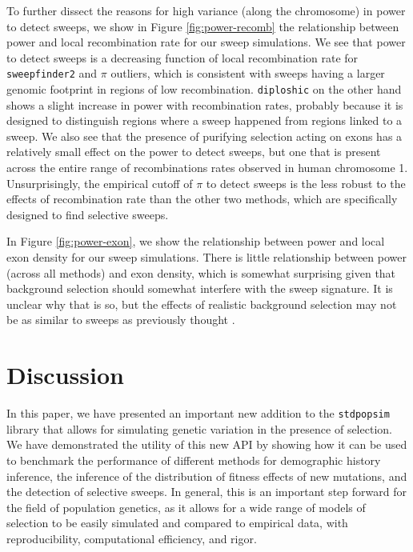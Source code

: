 \documentclass[hidelinks]{article}
\newcommand{\stdpopsim}{\texttt{stdpopsim}\xspace}
\newcommand{\sweepfinder}{\texttt{sweepfinder2}\xspace}
\newcommand{\diploshic}{\texttt{diploshic}\xspace}
\begin{document}
    To further dissect the reasons for high variance (along the chromosome) in power to detect sweeps,
    we show in Figure \ref{fig:power-recomb} the relationship between power and local recombination rate for our sweep simulations.
    We see that power to detect sweeps is
    a decreasing function of local recombination rate for \sweepfinder and $\pi$ outliers,
    which is consistent with sweeps having a larger genomic footprint in regions of low
    recombination.
    \diploshic on the other hand shows a slight increase in power with recombination rates,
    probably because it is designed to distinguish regions where a sweep happened from regions linked to a sweep.
    We also see that the presence of purifying selection acting on exons has a relatively small effect on the power to detect sweeps,    
    but one that is present across the entire range of recombinations rates observed in human chromosome 1. 
    Unsurprisingly, the empirical cutoff of $\pi$ to detect sweeps is the less robust to the effects of recombination rate than the other two methods,
    which are specifically designed to find selective sweeps. 

    In Figure \ref{fig:power-exon}, we show the relationship between power and local exon density for our sweep simulations.
    There is little relationship between power (across all methods) and exon density,
    which is somewhat surprising given that background selection should somewhat interfere with the sweep signature.
    It is unclear why that is so, but the effects of realistic background selection may not be as similar to sweeps as previously thought \citep{schrider2020background}.

\section*{Discussion}
    \label{Discussion}
    In this paper, we have presented an important new addition to the \stdpopsim{} library
    that allows for simulating genetic variation in the presence of selection.
    We have demonstrated the utility of this new API by showing how it can be used to benchmark
    the performance of different methods for demographic history inference, the inference of the distribution
    of fitness effects of new mutations, and the detection of selective sweeps.
    In general, this is an important step forward for the field of population genetics,
    as it allows for a wide range of models of selection to be easily simulated and compared to
    empirical data, with reproducibility, computational efficiency, and rigor.
\end{document}
